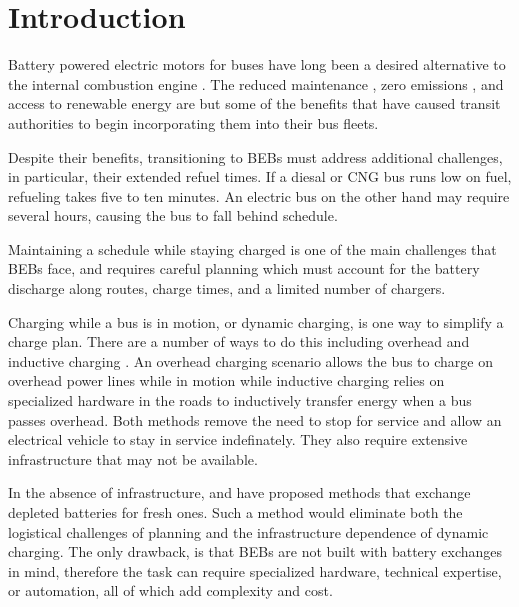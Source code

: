 \section{Introduction}
\par  Battery powered electric motors for buses have long been a desired alternative to the internal combustion engine \cite{Mahmoud2016}. The reduced maintenance \cite{poornesh_comparative_2020}, zero emissions \cite{kato_comparative_2013}, and access to renewable energy \cite{cheng_smart_2020} are but some of the benefits that have caused transit authorities to begin incorporating them into their bus fleets.  
\par Despite their benefits, transitioning to BEBs must address additional challenges, in particular, their extended refuel times. If a diesal or CNG bus runs low on fuel, refueling takes five to ten minutes.  An electric bus on the other hand may require several hours, causing the bus to fall behind schedule.
\par Maintaining a schedule while staying charged is one of the main challenges that BEBs face, and requires careful planning which must account for the battery discharge along routes, charge times, and a limited number of chargers. 
\par Charging while a bus is in motion, or dynamic charging, is one way to simplify a charge plan. There are a number of ways to do this including overhead \cite{csonka_optimization_2021} and inductive charging \cite{jeong_automatic_2018} \cite{balde_electric_2019}. An overhead charging scenario allows the bus to charge on overhead power lines while in motion while inductive charging relies on specialized hardware in the roads to inductively transfer energy when a bus passes overhead. Both methods remove the need to stop for service and allow an electrical vehicle to stay in service indefinately. They also require extensive infrastructure that may not be available.
\par In the absence of infrastructure, \cite{jain_battery_2020} and \cite{xian_zhang_optimal_2016} have proposed methods that exchange depleted batteries for fresh ones. Such a method would eliminate both the logistical challenges of planning and the infrastructure dependence of dynamic charging. The only drawback, is that BEBs are not built with battery exchanges in mind, therefore the task can require specialized hardware, technical expertise, or automation, all of which add complexity and cost.

